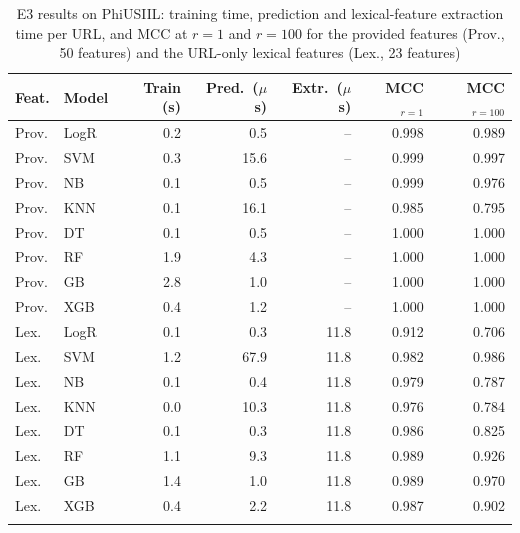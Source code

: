\begin{table}[htbp]
\caption{E3 results on PhiUSIIL: training time, prediction and lexical-feature extraction time per URL, and MCC at $r=1$ and $r=100$ for the provided features (Prov., 50 features) and the URL-only lexical features (Lex., 23 features)}\label{tab:e3}%
\begin{tabular}{@{}llrrrrr@{}}
\toprule
Feat. & Model & Train (s) & Pred.\ ($\mu$s) & Extr.\ ($\mu$s) & MCC$_{r=1}$ & MCC$_{r=100}$ \\
\midrule
Prov. & LogR & 0.2 & 0.5 & -- & 0.998 & 0.989 \\
Prov. & SVM & 0.3 & 15.6 & -- & 0.999 & 0.997 \\
Prov. & NB & 0.1 & 0.5 & -- & 0.999 & 0.976 \\
Prov. & KNN & 0.1 & 16.1 & -- & 0.985 & 0.795 \\
Prov. & DT & 0.1 & 0.5 & -- & 1.000 & 1.000 \\
Prov. & RF & 1.9 & 4.3 & -- & 1.000 & 1.000 \\
Prov. & GB & 2.8 & 1.0 & -- & 1.000 & 1.000 \\
Prov. & XGB & 0.4 & 1.2 & -- & 1.000 & 1.000 \\
Lex. & LogR & 0.1 & 0.3 & 11.8 & 0.912 & 0.706 \\
Lex. & SVM & 1.2 & 67.9 & 11.8 & 0.982 & 0.986 \\
Lex. & NB & 0.1 & 0.4 & 11.8 & 0.979 & 0.787 \\
Lex. & KNN & 0.0 & 10.3 & 11.8 & 0.976 & 0.784 \\
Lex. & DT & 0.1 & 0.3 & 11.8 & 0.986 & 0.825 \\
Lex. & RF & 1.1 & 9.3 & 11.8 & 0.989 & 0.926 \\
Lex. & GB & 1.4 & 1.0 & 11.8 & 0.989 & 0.970 \\
Lex. & XGB & 0.4 & 2.2 & 11.8 & 0.987 & 0.902 \\
\botrule
\end{tabular}
\end{table}
